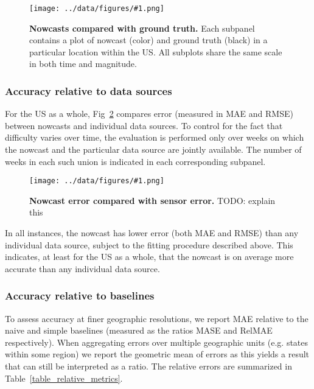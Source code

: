 \documentclass[10pt,letterpaper]{article}
\newcommand{\maybeincludegraphics}[1]{\texttt{[image: ../data/figures/\#1.png]}}
\begin{document}
\begin{figure}[!ht]
  \maybeincludegraphics{all_nowcasts}
  \caption{
    {\bf Nowcasts compared with ground truth.}
    Each subpanel contains a plot of nowcast (color) and ground truth (black)
    in a particular location within the US. All subplots share the same scale
    in both time and magnitude.
  }
  \label{figure_all_nowcasts}
\end{figure}

\subsubsection*{Accuracy relative to data sources}

For the US as a whole, Fig~\ref{figure_accuracy_vs_sensors} compares error
(measured in MAE and RMSE) between nowcasts and individual data sources. To
control for the fact that difficulty varies over time, the evaluation is
performed only over weeks on which the nowcast and the particular data source
are jointly available. The number of weeks in each such union is indicated in
each corresponding subpanel.

\begin{figure}[!ht]
  \maybeincludegraphics{accuracy_vs_sensors}
  \caption{
    {\bf Nowcast error compared with sensor error.}
    TODO: explain this
  }
  \label{figure_accuracy_vs_sensors}
\end{figure}

In all instances, the nowcast has lower error (both MAE and RMSE) than any
individual data source, subject to the fitting procedure described above. This
indicates, at least for the US as a whole, that the nowcast is on average more
accurate than any individual data source.

\subsubsection*{Accuracy relative to baselines}

To assess accuracy at finer geographic resolutions, we report MAE relative to
the naive and simple baselines (measured as the ratios MASE and RelMAE
respectively). When aggregating errors over multiple geographic units (e.g.
states within some region) we report the geometric mean of errors as this
yields a result that can still be interpreted as a ratio. The relative errors
are summarized in Table~\ref{table_relative_metrics}.
\end{document}
